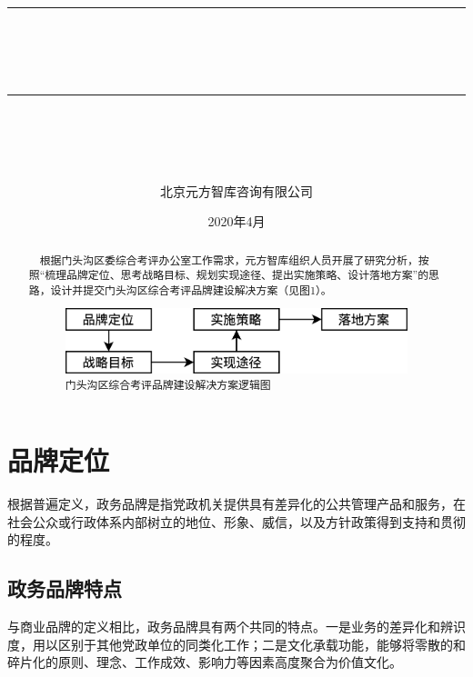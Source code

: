 \documentclass[12pt]{article} %
\newcommand{\horrule}[1]{\rule[0.5ex]{\linewidth}{#1}} 	%
\begin{document}
\title{
\horrule{0.5pt}\\
\horrule{1.8pt}\\[20pt]
}
\author{北京元方智库咨询有限公司}
\date{2020年4月} %

\begin{titlepage}
\maketitle
\vspace{30pt}
\begin{abstract}
\normalsize \ \ 根据门头沟区委综合考评办公室工作需求，元方智库组织人员开展了研究分析，按照“梳理品牌定位、思考战略目标、规划实现途径、提出实施策略、设计落地方案”的思路，设计并提交门头沟区综合考评品牌建设解决方案（见图1）。\\[5pt]
\begin{figure}[ht]
\centering
\includegraphics[width=\textwidth]{figures/1.png}
\caption{门头沟区综合考评品牌建设解决方案逻辑图}
\label{fig:fig1}
\end{figure}
\end{abstract}
\thispagestyle{empty}
\end{titlepage}

\newpage
\mbox{}
\thispagestyle{empty}
\newpage

\tableofcontents
\thispagestyle{empty}

\newpage
\mbox{}
\thispagestyle{empty}
\newpage

\newpage
\setcounter{page}{1}

\section{品牌定位}
根据普遍定义，政务品牌是指党政机关提供具有差异化的公共管理产品和服务，在社会公众或行政体系内部树立的地位、形象、威信，以及方针政策得到支持和贯彻的程度。

\subsection{政务品牌特点}
与商业品牌的定义相比，政务品牌具有两个共同的特点。一是业务的差异化和辨识度，用以区别于其他党政单位的同类化工作；二是文化承载功能，能够将零散的和碎片化的原则、理念、工作成效、影响力等因素高度聚合为价值文化。
\end{document}
